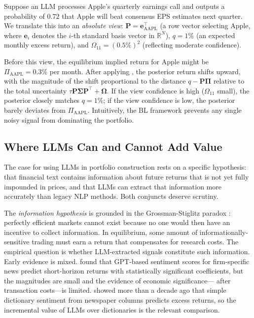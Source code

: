 \begin{example}
\label{ex:ch10-bl-single-view}
Suppose an LLM processes Apple's quarterly earnings call and outputs a probability of
$0.72$ that Apple will beat consensus EPS estimates next quarter. We translate this into
an \emph{absolute view}: $\mathbf{P} = \mathbf{e}_{\text{AAPL}}^\top$ (a row vector
selecting Apple, where $\mathbf{e}_i$ denotes the $i$-th standard basis vector in $\mathbb{R}^N$), $q = 1\%$ (an expected monthly excess return), and $\Omega_{11} =
(0.5\%)^2$ (reflecting moderate confidence).

Before this view, the equilibrium implied return for Apple might be $\Pi_{\text{AAPL}} =
0.3\%$ per month. After applying , the posterior
return shifts upward, with the magnitude of the shift proportional to the distance
$q - \mathbf{P}\boldsymbol{\Pi}$ relative to the total uncertainty
$\tau \mathbf{P}\boldsymbol{\Sigma}\mathbf{P}^\top + \boldsymbol{\Omega}$. If the view
confidence is high ($\Omega_{11}$ small), the posterior closely matches $q = 1\%$; if
the view confidence is low, the posterior barely deviates from $\Pi_{\text{AAPL}}$.
Intuitively, the BL framework prevents any single noisy signal from dominating the
portfolio.
\end{example}

\subsection{Where LLMs Can and Cannot Add Value}
\label{sec:ch10-llm-limits}

The case for using LLMs in portfolio construction rests on a specific hypothesis: that
financial text contains information about future returns that is not yet fully impounded
in prices, and that LLMs can extract that information more accurately than legacy NLP
methods. Both conjuncts deserve scrutiny.

The \emph{information hypothesis} is grounded in the Grossman-Stiglitz paradox
\citep{grossman1980impossibility}: perfectly efficient markets cannot exist because no one would
then have an incentive to collect information. In equilibrium, some amount of
informationally-sensitive trading must earn a return that compensates for research costs.
The empirical question is whether LLM-extracted signals constitute such information. Early
evidence is mixed. \citet{LopezLiraTang2023} found that GPT-based sentiment scores for
firm-specific news predict short-horizon returns with statistically significant
coefficients, but the magnitudes are small and the evidence of economic significance---
after transaction costs---is limited. \citet{tetlock2007giving} showed more than a decade
ago that simple dictionary sentiment from newspaper columns predicts excess returns, so
the incremental value of LLMs over dictionaries is the relevant comparison.

